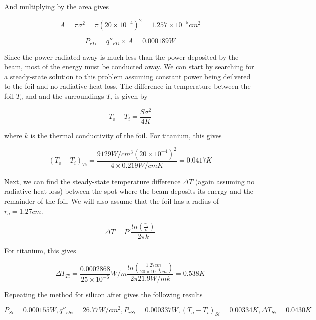 \documentclass[12pt]{article}
\begin{document}
And multiplying by the area gives

\begin{equation}
A=\pi \sigma^{2}=\pi (20 \times 10^{-4})^2=1.257 \times 10^{-5} cm^2
\end{equation}

\begin{equation}
P_{r Ti}=q''_{r Ti} \times A=0.000189 W
\end{equation}

Since the power radiated away is much less than the power deposited by the beam, most of the energy must be conducted away. We can start by searching for a steady-state solution to this problem assuming constant power being deilvered to the foil and no radiative heat loss. The difference in temperature between the foil $T_o$ and and the surroundings $T_i$ is given by

\begin{equation}
T_o-T_i=\frac{S \sigma^{2}}{4 K}
\end{equation}

where $k$ is the thermal conductivity of the foil. For titanium, this gives

\begin{equation}
(T_o-T_i)_{Ti}=\frac{9129 W/cm^3 (20 \times 10^{-4})^{2}}{4 \times 0.219 W/cm K}=0.0417 K
\end{equation}

Next, we can find the steady-state temperature difference $\Delta T$ (again assuming no radiative heat loss) between the spot where the beam deposits its energy and the remainder of the foil. We will also assume that the foil has a radius of $r_o=1.27 cm$. 

\begin{equation}
\Delta T=P' \frac{ln(\frac{r_o}{\sigma})}{2 \pi k}
\end{equation}

For titanium, this gives

\begin{equation}
\Delta T_{Ti}=\frac{0.0002868}{25 \times 10^{-6}} W/m \frac{ln(\frac{1.27 cm}{20 \times 10^{-4} cm})}{2 \pi 21.9 W/mk}=0.538 K
\end{equation}

Repeating the method for silicon after gives the following results

\begin{equation}
P_{Si}= 0.000155 W, q''_{r Si}=26.77 W/cm^2 , P_{r Si}=0.000337 W , (T_o-T_i)_{Si}=0.00334 K , \Delta T_{Si}=0.0430 K
\end{equation}
\end{document}
